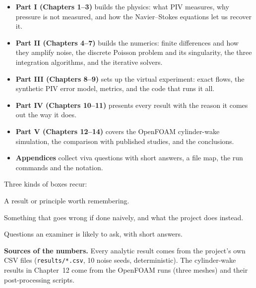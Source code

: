 \documentclass[11pt,a4paper]{report}
\newcommand{\code}[1]{\texttt{\small #1}}
\begin{document}
\begin{itemize}
  \item \textbf{Part I (Chapters 1--3)} builds the physics: what PIV measures, why pressure is not measured, and how the Navier--Stokes equations let us recover it.
  \item \textbf{Part II (Chapters 4--7)} builds the numerics: finite differences and how they amplify noise, the discrete Poisson problem and its singularity, the three integration algorithms, and the iterative solvers.
  \item \textbf{Part III (Chapters 8--9)} sets up the virtual experiment: exact flows, the synthetic PIV error model, metrics, and the code that runs it all.
  \item \textbf{Part IV (Chapters 10--11)} presents every result with the reason it comes out the way it does.
  \item \textbf{Part V (Chapters 12--14)} covers the OpenFOAM cylinder-wake simulation, the comparison with published studies, and the conclusions.
  \item \textbf{Appendices} collect viva questions with short answers, a file map, the run commands and the notation.
\end{itemize}

Three kinds of boxes recur:
\begin{keyidea}A result or principle worth remembering.\end{keyidea}
\begin{pitfall}Something that goes wrong if done naively, and what the project does instead.\end{pitfall}
\begin{viva}Questions an examiner is likely to ask, with short answers.\end{viva}

\textbf{Sources of the numbers.} Every analytic result comes from the project's own CSV files (\code{results/*.csv}, 10 noise seeds, deterministic). The cylinder-wake results in Chapter~12 come from the OpenFOAM runs (three meshes) and their post-processing scripts.

\tableofcontents

\clearpage
{}







\end{document}
